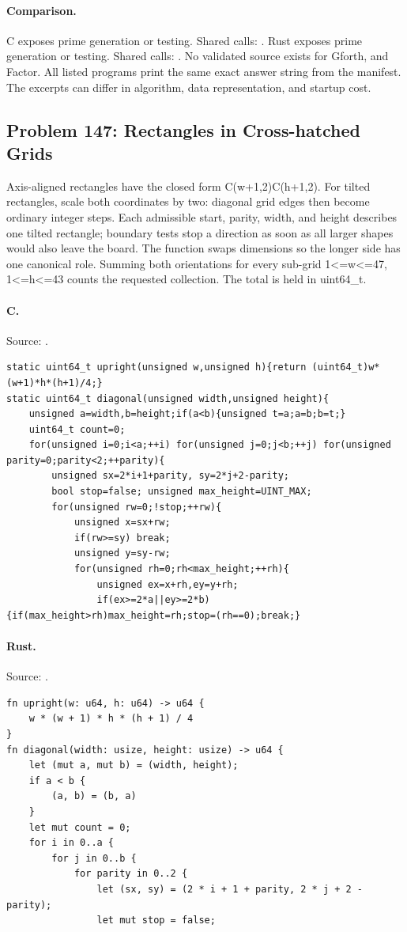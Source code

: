 \paragraph{Comparison.}
C exposes prime generation or testing. Shared calls: \texttt{}. Rust exposes prime generation or testing. Shared calls: \texttt{}.
No validated source exists for Gforth, and Factor.
All listed programs print the same exact answer string from the manifest. The excerpts can differ in algorithm, data representation, and startup cost.

\subsection{Problem 147: Rectangles in Cross-hatched Grids}
\label{walkthrough:p147}
Axis-aligned rectangles have the closed form C(w+1,2)C(h+1,2). For tilted rectangles, scale both coordinates by two: diagonal grid edges then become ordinary integer steps. Each admissible start, parity, width, and height describes one tilted rectangle; boundary tests stop a direction as soon as all larger shapes would also leave the board. The function swaps dimensions so the longer side has one canonical role. Summing both orientations for every sub-grid 1<=w<=47, 1<=h<=43 counts the requested collection. The total is held in uint64\_t.

\paragraph{C.} Source: .
\begin{lstlisting}
static uint64_t upright(unsigned w,unsigned h){return (uint64_t)w*(w+1)*h*(h+1)/4;}
static uint64_t diagonal(unsigned width,unsigned height){
    unsigned a=width,b=height;if(a<b){unsigned t=a;a=b;b=t;}
    uint64_t count=0;
    for(unsigned i=0;i<a;++i) for(unsigned j=0;j<b;++j) for(unsigned parity=0;parity<2;++parity){
        unsigned sx=2*i+1+parity, sy=2*j+2-parity;
        bool stop=false; unsigned max_height=UINT_MAX;
        for(unsigned rw=0;!stop;++rw){
            unsigned x=sx+rw;
            if(rw>=sy) break;
            unsigned y=sy-rw;
            for(unsigned rh=0;rh<max_height;++rh){
                unsigned ex=x+rh,ey=y+rh;
                if(ex>=2*a||ey>=2*b){if(max_height>rh)max_height=rh;stop=(rh==0);break;}
\end{lstlisting}

\paragraph{Rust.} Source: .
\begin{lstlisting}
fn upright(w: u64, h: u64) -> u64 {
    w * (w + 1) * h * (h + 1) / 4
}
fn diagonal(width: usize, height: usize) -> u64 {
    let (mut a, mut b) = (width, height);
    if a < b {
        (a, b) = (b, a)
    }
    let mut count = 0;
    for i in 0..a {
        for j in 0..b {
            for parity in 0..2 {
                let (sx, sy) = (2 * i + 1 + parity, 2 * j + 2 - parity);
                let mut stop = false;
\end{lstlisting}

